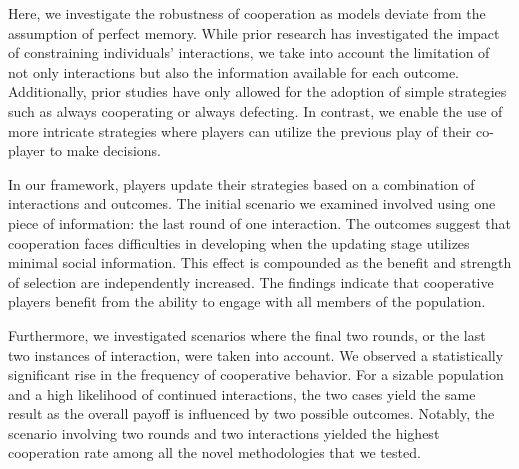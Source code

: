 \documentclass[11pt]{article}
\theoremstyle{plainCl1}
\theoremstyle{plainCl2}
\begin{document}
Here, we investigate the robustness of cooperation as models deviate
from the assumption of perfect memory. While prior research has investigated the
impact of constraining individuals' interactions, we take into account the
limitation of not only interactions but also the information available for each
outcome. Additionally, prior studies have only allowed for the adoption of
simple strategies such as always cooperating or always defecting. In contrast,
we enable the use of more intricate strategies where players can utilize the
previous play of their co-player to make decisions.

In our framework, players update their strategies based on a combination of
interactions and outcomes. The initial scenario we examined involved using one
piece of information: the last round of one interaction. The outcomes suggest
that cooperation faces difficulties in developing when the updating stage
utilizes minimal social information. This effect is compounded as the benefit
and strength of selection are independently increased. The findings indicate
that cooperative players benefit from the ability to engage with all members of
the population.

Furthermore, we investigated scenarios where the final two rounds, or the last
two instances of interaction, were taken into account. We observed a
statistically significant rise in the frequency of cooperative behavior. For a
sizable population and a high likelihood of continued interactions, the two
cases yield the same result as the overall payoff is influenced by two possible
outcomes. Notably, the scenario involving two rounds and two interactions
yielded the highest cooperation rate among all the novel methodologies that we
tested.\\



\end{document}

